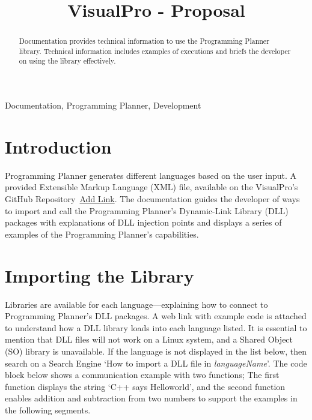 \documentclass[conference]{IEEEtran}
\begin{document}
	\title{VisualPro - Proposal}

	\author{
	}

     \maketitle
    
    \thispagestyle{plain}
    \pagestyle{plain}
    
    \tableofcontents
	  \vspace{.5cm}
    \begin{abstract}
      Documentation provides technical information to use the Programming Planner library. Technical information includes examples of executions and briefs the developer on using the library effectively.
    \end{abstract}

    \begin{IEEEkeywords}
        Documentation, Programming Planner, Development
    \end{IEEEkeywords}

    \section{Introduction}
      Programming Planner generates different languages based on the user input. A provided Extensible Markup Language (XML) file, available on the VisualPro's GitHub Repository~\href{#}{Add Link}. The documentation guides the developer of ways to import and call the Programming Planner's Dynamic-Link Library (DLL) packages with explanations of DLL injection points and displays a series of examples of the Programming Planner's capabilities.

    \section{Importing the Library}
      Libraries are available for each language—explaining how to connect to Programming Planner's DLL packages. A web link with example code is attached to understand how a DLL library loads into each language listed. It is essential to mention that DLL files will not work on a Linux system, and a Shared Object (SO) library is unavailable. If the language is not displayed in the list below, then search on a Search Engine `How to import a DLL file in \textit{languageName}'. The code block below shows a communication example with two functions; The first function displays the string `C++ says Helloworld', and the second function enables addition and subtraction from two numbers to support the examples in the following segments.
\end{document}
